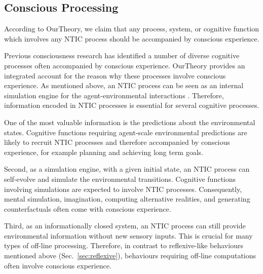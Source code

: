 \documentclass[utf8]{article}
\begin{document}
                
                



		\subsection{Conscious Processing}\label{sec:conscious processing}
		    According to \ac{OurTheory}, we claim that any process, system, or cognitive function which involves any NTIC process should be accompanied by conscious experience. 
		    
		    Previous consciousness research has identified a number of diverse cognitive processes often accompanied by conscious experience. \ac{OurTheory} provides an integrated account for the reason why these processes involve conscious experience. As mentioned above, an NTIC process can be seen as an internal simulation engine for the agent-environmental interactions \citep{BERTSCHINGER.2006}. Therefore, information encoded in NTIC processes is essential for several cognitive processes. 
		    
		    One of the most valuable information is the predictions about the environmental states. Cognitive functions requiring agent-scale environmental predictions are likely to recruit NTIC processes and therefore accompanied by conscious experience, for example planning and achieving long term goals.
		   
            Second, as a simulation engine, with a given initial state, an NTIC process can self-evolve and simulate the environmental transitions. Cognitive functions involving simulations are expected to involve NTIC processes. Consequently, mental simulation, imagination, computing alternative realities, and generating counterfactuals often come with conscious experience. 
            
    	    Third, as an informationally closed system, an NTIC process can still provide environmental information without new sensory inputs. This is crucial for many types of off-line processing. Therefore, in contrast to reflexive-like behaviours mentioned above (Sec.~\ref{sec:reflexive}), behaviours requiring off-line computations \citep{milner1999paradoxical, himmelbach2005dorsal,revol2003pointing} often involve conscious experience. 
    	    
\end{document}
